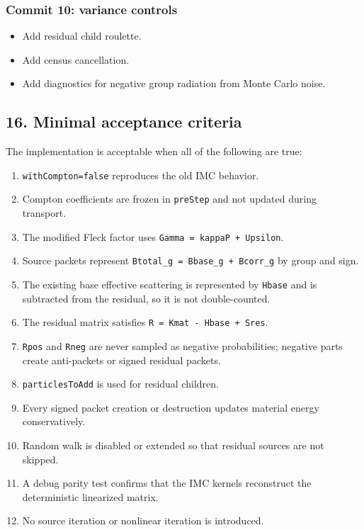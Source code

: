 \documentclass[
]{article}
\providecommand{\tightlist}{%
  \setlength{\itemsep}{0pt}\setlength{\parskip}{0pt}}
\begin{document}
\subsubsection{Commit 10: variance
controls}\label{commit-10-variance-controls}

\begin{itemize}
\tightlist
\item
  Add residual child roulette.
\item
  Add census cancellation.
\item
  Add diagnostics for negative group radiation from Monte Carlo noise.
\end{itemize}

\subsection{16. Minimal acceptance
criteria}\label{minimal-acceptance-criteria}

The implementation is acceptable when all of the following are true:

\begin{enumerate}
\def\labelenumi{\arabic{enumi}.}
\tightlist
\item
  \texttt{withCompton=false} reproduces the old IMC behavior.
\item
  Compton coefficients are frozen in \texttt{preStep} and not updated
  during transport.
\item
  The modified Fleck factor uses \texttt{Gamma\ =\ kappaP\ +\ Upsilon}.
\item
  Source packets represent \texttt{Btotal\_g\ =\ Bbase\_g\ +\ Bcorr\_g}
  by group and sign.
\item
  The existing base effective scattering is represented by
  \texttt{Hbase} and is subtracted from the residual, so it is not
  double-counted.
\item
  The residual matrix satisfies \texttt{R\ =\ Kmat\ -\ Hbase\ +\ Sres}.
\item
  \texttt{Rpos} and \texttt{Rneg} are never sampled as negative
  probabilities; negative parts create anti-packets or signed residual
  packets.
\item
  \texttt{particlesToAdd} is used for residual children.
\item
  Every signed packet creation or destruction updates material energy
  conservatively.
\item
  Random walk is disabled or extended so that residual sources are not
  skipped.
\item
  A debug parity test confirms that the IMC kernels reconstruct the
  deterministic linearized matrix.
\item
  No source iteration or nonlinear iteration is introduced.
\end{enumerate}
\end{document}
